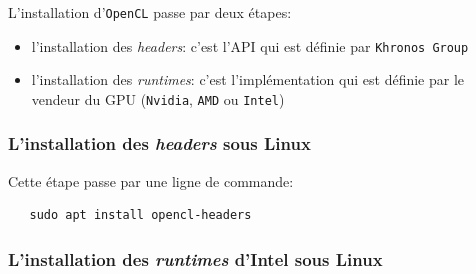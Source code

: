 L'installation d'\texttt{OpenCL} passe par deux étapes:
\begin{itemize}
    \item l'installation des \textit{headers}: c’est l’API qui est définie 
        par \texttt{Khronos Group}
    \item l'installation des \textit{runtimes}: c’est l’implémentation qui est 
        définie par le vendeur du GPU (\texttt{Nvidia}, \texttt{AMD} ou 
        \texttt{Intel})
\end{itemize}

\subsubsection{L'installation des \textit{headers} sous Linux}

Cette étape passe par une ligne de commande:
\begin{lstlisting}
   sudo apt install opencl-headers
\end{lstlisting}

\subsubsection{L'installation des \textit{runtimes} d'Intel sous Linux}

